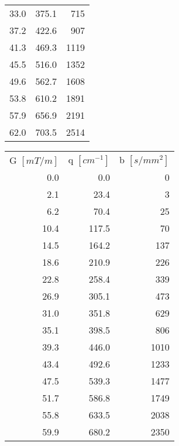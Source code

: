 \begin{table}[p]
\begin{tableframe}
{\begin{tabular}{rrr}
                33.0  & 375.1 & 715 \\
                37.2  & 422.6 & 907 \\
                41.3  & 469.3 & 1119 \\
                45.5  & 516.0 & 1352 \\
                49.6  & 562.7 & 1608 \\
                53.8  & 610.2 & 1891 \\
                57.9  & 656.9 & 2191 \\
                62.0  & 703.5 & 2514 \\
                \bottomrule
            \end{tabular}%
            \hspace{0.2cm}%
            \begin{tabular}{rrr}
            \addlinespace
                \multicolumn{3}{l}{\textit{... continued}}\\
            \toprule
                G $[mT/m]$ & q $[cm^{-1}]$ & b $[s/mm^2]$ \\
                \cmidrule(r){1-1}\cmidrule(lr){2-2}\cmidrule(l){3-3}
                0.0   & 0.0   & 0 \\
                2.1   & 23.4  & 3 \\
                6.2   & 70.4  & 25 \\
                10.4  & 117.5 & 70 \\
                14.5  & 164.2 & 137 \\
                18.6  & 210.9 & 226 \\
                22.8  & 258.4 & 339 \\
                26.9  & 305.1 & 473 \\
                31.0  & 351.8 & 629 \\
                35.1  & 398.5 & 806 \\
                39.3  & 446.0 & 1010 \\
                43.4  & 492.6 & 1233 \\
                47.5  & 539.3 & 1477 \\
                51.7  & 586.8 & 1749 \\
                55.8  & 633.5 & 2038 \\
                59.9  & 680.2 & 2350 \\
                \bottomrule
            \end{tabular}%
     }
\end{tableframe}
\end{table}



